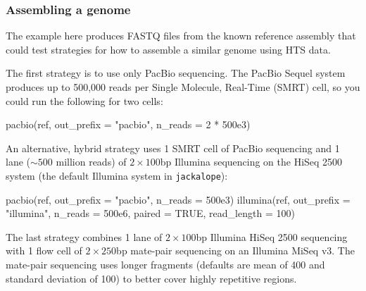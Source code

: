 \documentclass[12pt,]{article}
\newenvironment{Shaded}{}{}
\newcommand{\DataTypeTok}[1]{#1}
\newcommand{\DecValTok}[1]{#1}
\newcommand{\FloatTok}[1]{#1}
\newcommand{\KeywordTok}[1]{\textcolor[rgb]{0.00,0.00,1.00}{#1}}
\newcommand{\NormalTok}[1]{#1}
\newcommand{\OperatorTok}[1]{#1}
\newcommand{\OtherTok}[1]{\textcolor[rgb]{1.00,0.25,0.00}{#1}}
\newcommand{\StringTok}[1]{\textcolor[rgb]{0.00,0.50,0.50}{#1}}
\begin{document}
\hypertarget{assembling-a-genome}{%
\subsubsection{Assembling a genome}\label{assembling-a-genome}}

The example here produces FASTQ files from the known reference assembly that could
test strategies for how to assemble a similar genome using HTS data.

The first strategy is to use only PacBio sequencing.
The PacBio Sequel system produces up to 500,000 reads per
Single Molecule, Real-Time (SMRT) cell, so you could
run the following for two cells:

\begin{Shaded}
\begin{Highlighting}[]
\KeywordTok{pacbio}\NormalTok{(ref, }\DataTypeTok{out_prefix =} \StringTok{"pacbio"}\NormalTok{, }\DataTypeTok{n_reads =} \DecValTok{2} \OperatorTok{*}\StringTok{ }\FloatTok{500e3}\NormalTok{)}
\end{Highlighting}
\end{Shaded}

An alternative, hybrid strategy uses
1 SMRT cell of PacBio sequencing and
1 lane (\(\sim 500\) million reads) of \(2 \times 100\)bp Illumina
sequencing on the HiSeq 2500 system (the default Illumina system in \texttt{jackalope}):

\begin{Shaded}
\begin{Highlighting}[]
\KeywordTok{pacbio}\NormalTok{(ref, }\DataTypeTok{out_prefix =} \StringTok{"pacbio"}\NormalTok{, }\DataTypeTok{n_reads =} \FloatTok{500e3}\NormalTok{)}
\KeywordTok{illumina}\NormalTok{(ref, }\DataTypeTok{out_prefix =} \StringTok{"illumina"}\NormalTok{, }\DataTypeTok{n_reads =} \FloatTok{500e6}\NormalTok{, }\DataTypeTok{paired =} \OtherTok{TRUE}\NormalTok{,}
         \DataTypeTok{read_length =} \DecValTok{100}\NormalTok{)}
\end{Highlighting}
\end{Shaded}

The last strategy combines 1 lane of \(2 \times 100\)bp Illumina HiSeq 2500 sequencing
with 1 flow cell of \(2 \times 250\)bp mate-pair sequencing on an Illumina MiSeq v3.
The mate-pair sequencing uses longer fragments (defaults are mean of 400 and
standard deviation of 100) to better cover highly
repetitive regions.
\end{document}
